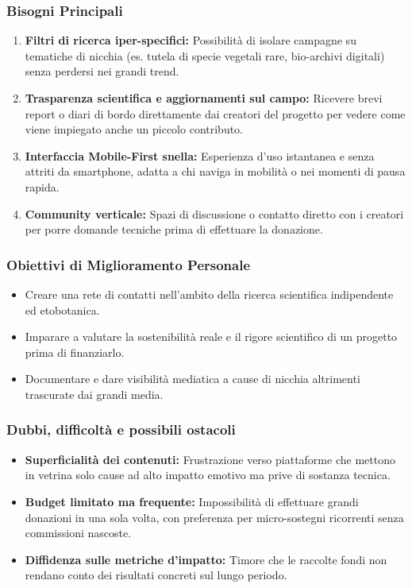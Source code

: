 \documentclass[11pt,a4paper]{article}
\begin{document}
\subsubsection{Bisogni Principali}
\begin{enumerate}
    \item \textbf{Filtri di ricerca iper-specifici:} Possibilità di isolare campagne su tematiche di nicchia (es. tutela di specie vegetali rare, bio-archivi digitali) senza perdersi nei grandi trend.
    \item \textbf{Trasparenza scientifica e aggiornamenti sul campo:} Ricevere brevi report o diari di bordo direttamente dai creatori del progetto per vedere come viene impiegato anche un piccolo contributo.
    \item \textbf{Interfaccia Mobile-First snella:} Esperienza d'uso istantanea e senza attriti da smartphone, adatta a chi naviga in mobilità o nei momenti di pausa rapida.
    \item \textbf{Community verticale:} Spazi di discussione o contatto diretto con i creatori per porre domande tecniche prima di effettuare la donazione.
\end{enumerate}

\subsubsection{Obiettivi di Miglioramento Personale}
\begin{itemize}
    \item Creare una rete di contatti nell'ambito della ricerca scientifica indipendente ed etobotanica.
    \item Imparare a valutare la sostenibilità reale e il rigore scientifico di un progetto prima di finanziarlo.
    \item Documentare e dare visibilità mediatica a cause di nicchia altrimenti trascurate dai grandi media.
\end{itemize}

\subsubsection{Dubbi, difficoltà e possibili ostacoli}
\begin{itemize}
    \item \textbf{Superficialità dei contenuti:} Frustrazione verso piattaforme che mettono in vetrina solo cause ad alto impatto emotivo ma prive di sostanza tecnica.
    \item \textbf{Budget limitato ma frequente:} Impossibilità di effettuare grandi donazioni in una sola volta, con preferenza per micro-sostegni ricorrenti senza commissioni nascoste.
    \item \textbf{Diffidenza sulle metriche d'impatto:} Timore che le raccolte fondi non rendano conto dei risultati concreti sul lungo periodo.
\end{itemize}
\end{document}
